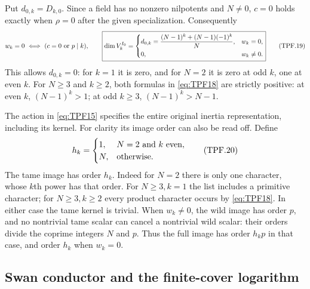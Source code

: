 Put \(d_{0,k}=D_{k,0}\). Since a field has no nonzero
nilpotents and \(N\ne0\), \(c=0\) holds exactly when
\(\rho=0\) after the given specialization. Consequently
\[
 w_k=0\ \Longleftrightarrow\ (c=0\ \hbox{or}\ p\mid k),
 \qquad
 \boxed{\displaystyle
 \dim V_k^{I_0}=
 \begin{cases}
 d_{0,k}=\dfrac{(N-1)^k+(N-1)(-1)^k}{N},&w_k=0,\\[5pt]
 0,&w_k\ne0 .
 \end{cases}}
 \tag{TPF.19}\label{eq:TPF19}
\]
This allows \(d_{0,k}=0\): for \(k=1\) it is zero,
and for \(N=2\) it is zero at odd \(k\), one at even
\(k\). For \(N\ge3\) and \(k\ge2\), both formulas
in \eqref{eq:TPF18} are strictly positive: at even
\(k\), \((N-1)^k>1\); at odd \(k\ge3\),
\((N-1)^k>N-1\).

The action in \eqref{eq:TPF15} specifies the entire
original inertia representation, including its kernel.
For clarity its image order can also be read off.
Define
\[
 h_k=\begin{cases}1,&N=2\ \hbox{and }k\ \hbox{even},\\
                  N,&\hbox{otherwise}.
       \end{cases}
 \tag{TPF.20}\label{eq:TPF20}
\]
The tame image has order \(h_k\). Indeed for \(N=2\)
there is only one character, whose \(k\)th power has
that order. For \(N\ge3,k=1\) the list includes a
primitive character; for \(N\ge3,k\ge2\) every product
character occurs by \eqref{eq:TPF18}. In either case
the tame kernel is trivial. When \(w_k\ne0\), the wild
image has order \(p\), and no nontrivial tame scalar
can cancel a nontrivial wild scalar: their orders
divide the coprime integers \(N\) and \(p\).
Thus the full image has order \(h_kp\) in that case,
and order \(h_k\) when \(w_k=0\).

\subsection{Swan conductor and the finite-cover logarithm}

